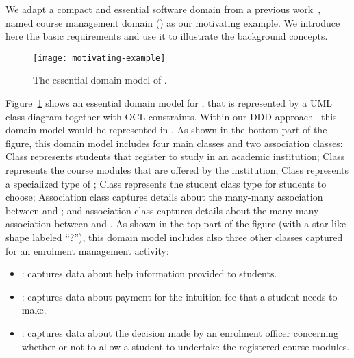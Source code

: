 We adapt a compact and essential software domain from a previous work~\cite{le_domain_2018}, named course management domain (\courseman) as our motivating example. We introduce here the basic \courseman requirements and use it to illustrate the background concepts. 

\begin{figure}[th]
\begin{center}
\texttt{[image: motivating-example]}
\end{center}
\caption{The essential domain model of \courseman.}
\label{fig:motivatingExample}
\end{figure}

Figure~\ref{fig:motivatingExample} shows an essential domain model for , that is represented by a UML class diagram together with OCL constraints. Within our DDD approach~\cite{le_domain_2018} this domain model would be represented in \dcsl. As shown in the bottom part of the figure, this domain model includes four main classes and two association classes: Class  represents students that register to study in an academic institution; Class  represents the course modules that are offered by the institution; Class  represents a specialized type of ; Class  represents the student class type for students to choose; Association class  captures details about the many-many association between  and ; and association class  captures details about the many-many association between  and .
As shown in the top part of the figure (with a star-like shape labeled ``?''), this domain model includes also three other classes captured for an enrolment management activity: 
%
\begin{itemize}[noitemsep]
  \item {}: captures data about help information provided to students.
  \item {}: captures data about payment for the intuition fee that a student needs to make.
  \item {}: captures data about the decision made by an enrolment officer concerning whether or not to allow a student to undertake the registered course modules.
\end{itemize}

